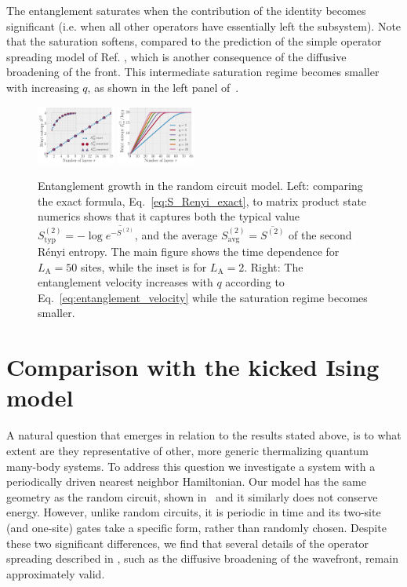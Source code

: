 \documentclass[aps,prb,twocolumn,superscriptaddress]{revtex4-1}
\begin{document}
The entanglement saturates when the contribution of the identity becomes significant (i.e. when all other operators have essentially left the subsystem). Note that the saturation softens, compared to the prediction of the simple operator spreading model of Ref. , which is another consequence of the diffusive broadening of the front. This intermediate saturation regime becomes smaller with increasing $q$, as shown in the left panel of~.

 \begin{figure}[h!]
 \centering
  	\includegraphics[width=0.23\textwidth]{random_circuit_entanglement_compare.pdf}
  	\includegraphics[width=0.23\textwidth]{random_circuit_entanglement_qdep.pdf} 

 \caption{Entanglement growth in the random circuit model. Left: comparing the exact formula, Eq.~\eqref{eq:S_Renyi_exact}, to matrix product state numerics shows that it captures both the typical value $S^{(2)}_\text{typ} = -\log{\overline{e^{-S^{(2)}}}}$, and the average $S^{(2)}_\text{avg} = \overline{S^{(2)}}$ of the second R\'enyi entropy. The main figure shows the time dependence for $L_\text{A} = 50$ sites, while the inset is for $L_\text{A} = 2$. Right: The entanglement velocity increases with $q$ according to Eq.~\eqref{eq:entanglement_velocity} while the saturation regime becomes smaller.}
  \label{fig:randomcircuit_entanglement}
 \end{figure}

\section{Comparison with the kicked Ising model}\label{s:kickedIsing}

A natural question that emerges in relation to the results stated above, is to what extent are they representative of other, more generic thermalizing quantum many-body systems. To address this question we investigate a system with a periodically driven nearest neighbor Hamiltonian. Our model has the same geometry as the random circuit, shown in~ and it similarly does not conserve energy. However, unlike random circuits, it is periodic in time and its two-site (and one-site) gates take a specific form, rather than randomly chosen. Despite these two significant differences, we find that several details of the operator spreading described in , such as the diffusive broadening of the wavefront, remain approximately valid.
\end{document}
